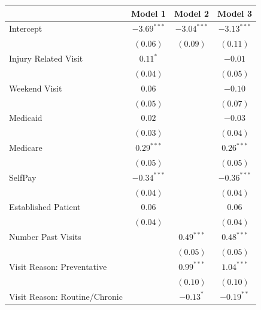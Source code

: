 \documentclass[12pt,twoside]{reedthesis}
\begin{document}
  \begin{table}
  \begin{center}
  \begin{footnotesize}
  \begin{tabular}{l c c c }
  \hline
   & Model 1 & Model 2 & Model 3 \\
  \hline
  Intercept                     & $-3.69^{***}$ & $-3.04^{***}$ & $-3.13^{***}$ \\
                                & $(0.06)$      & $(0.09)$      & $(0.11)$      \\
  Injury Related Visit          & $0.11^{*}$    &               & $-0.01$       \\
                                & $(0.04)$      &               & $(0.05)$      \\
  Weekend Visit                 & $0.06$        &               & $-0.10$       \\
                                & $(0.05)$      &               & $(0.07)$      \\
  Medicaid                      & $0.02$        &               & $-0.03$       \\
                                & $(0.03)$      &               & $(0.04)$      \\
  Medicare                      & $0.29^{***}$  &               & $0.26^{***}$  \\
                                & $(0.05)$      &               & $(0.05)$      \\
  SelfPay                       & $-0.34^{***}$ &               & $-0.36^{***}$ \\
                                & $(0.04)$      &               & $(0.04)$      \\
  Established Patient           & $0.06$        &               & $0.06$        \\
                                & $(0.04)$      &               & $(0.04)$      \\
  Number Past Visits            &               & $0.49^{***}$  & $0.48^{***}$  \\
                                &               & $(0.05)$      & $(0.05)$      \\
  Visit Reason: Preventative    &               & $0.99^{***}$  & $1.04^{***}$  \\
                                &               & $(0.10)$      & $(0.10)$      \\
  Visit Reason: Routine/Chronic &               & $-0.13^{*}$   & $-0.19^{**}$  \\

\end{tabular}
\end{footnotesize}
\end{center}
\end{table}
\end{document}
